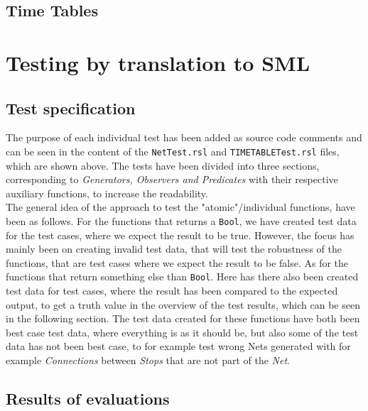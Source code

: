 \documentclass[a4]{article}
\begin{document}
\subsection{Time Tables}



\section{Testing by translation to SML}

\subsection{Test specification}

The purpose of each individual test has been added as source code comments and can be seen in the content of the \verb=NetTest.rsl=  and \verb=TIMETABLETest.rsl= files, which are shown above. The tests have been divided into three sections, corresponding to \emph{Generators, Observers and Predicates} with their respective auxiliary functions, to increase the readability. \\

The general idea of the approach to test the "atomic"/individual functions, have been as follows. For the functions that returns a \verb=Bool=, we have created test data for the test cases, where we expect the result to be true. However, the focus has mainly been on creating invalid test data, that will test the robustness of the functions, that are test cases where we expect the result to be false. As for the functions that return something else than \verb=Bool=. Here has there also been created test data for test cases, where the result has been compared to the expected output, to get a truth value in the overview of the test results, which can be seen in the following section. The test data created for these functions have both been best case test data, where everything is as it should be, but also some of the test data has not been best case, to for example test wrong Nets generated with for example \emph{Connections} between \emph{Stops} that are not part of the \emph{Net}.

\subsection{Results of evaluations}
\end{document}
